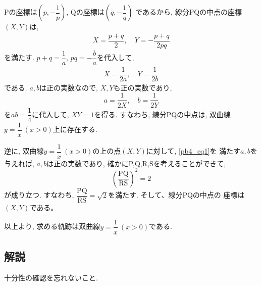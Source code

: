 \documentclass[dvipdfmx,a4paper]{jsarticle}
\newcommand{\2}{I\hspace{-1pt}I}
\newcommand{\3}{I\hspace{-1pt}I\hspace{-1pt}I}
\begin{document}
    Pの座標は$\left(p, -\dfrac{1}{p}\right)$, Qの座標は$\left(q, -\dfrac{1}{q} \right)$
    であるから, 線分PQの中点の座標$(X,Y)$は, 
    \begin{align*}
        X = \dfrac{p+q}{2}, \quad Y = -\dfrac{p+q}{2pq}
    \end{align*}
    を満たす. $p + q = \dfrac{1}{a}$, $pq = -\dfrac{b}{a}$を代入して, 
    \begin{align*}
        X = \dfrac{1}{2a}, \quad Y = \dfrac{1}{2b}
    \end{align*}
    である. $a,b$は正の実数なので, $X,Y$も正の実数であり, 
    \begin{equation} \label{pb4_eq1}
        a = \dfrac{1}{2X}, \quad b = \dfrac{1}{2Y}
    \end{equation}
    を$ab=\dfrac{1}{4}$に代入して, $XY=1$を得る. すなわち, 線分PQの中点は, 
    双曲線$y=\dfrac{1}{x} \ (x>0)$上に存在する. 

    逆に, 双曲線$y=\dfrac{1}{x} \ (x>0)$の上の点$(X,Y)$に対して, \eqref{pb4_eq1}を
    満たす$a,b$を与えれば, $a,b$は正の実数であり, 確かにP,Q,R,Sを考えることができて, 
    \begin{equation*}
        \left(\dfrac{\mathrm{PQ}}{\mathrm{RS}} \right)^2 = 2
    \end{equation*}
    が成り立つ. すなわち, $\mathrm{\dfrac{PQ}{RS} = \sqrt{2}}$を満たす. そして、線分PQの中点の
    座標は$(X,Y)$である。

    以上より, 求める軌跡は双曲線$y=\dfrac{1}{x} \ (x>0)$である. 

    \subsection{解説}
    十分性の確認を忘れないこと. 
\end{document}
